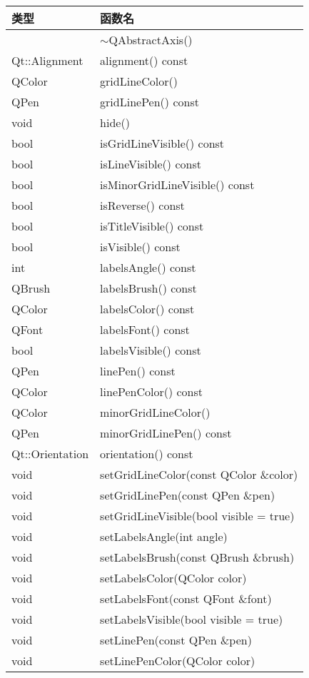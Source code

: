 \begin{longtable}{|l|l|}
\hline
类型  & 函数名\\
\hline
& $\sim$QAbstractAxis() \\
\hline
Qt::Alignment&	alignment() const \\
\hline
QColor&	gridLineColor()\\
\hline
QPen&	gridLinePen() const\\
\hline
void&	hide()\\
\hline
bool&	isGridLineVisible() const\\
\hline
bool&	isLineVisible() const\\
\hline
bool&	isMinorGridLineVisible() const\\
\hline
bool&	isReverse() const\\
\hline
bool&	isTitleVisible() const\\
\hline
bool&	isVisible() const\\
\hline
int&	labelsAngle() const\\
\hline
QBrush&	labelsBrush() const\\
\hline
QColor&	labelsColor() const\\
\hline
QFont&	labelsFont() const\\
\hline
bool&	labelsVisible() const\\
\hline
QPen&	linePen() const\\
\hline
QColor&	linePenColor() const\\
\hline
QColor&	minorGridLineColor()\\
\hline
QPen&	minorGridLinePen() const\\
\hline
Qt::Orientation &orientation() const\\
\hline
void&	setGridLineColor(const QColor \&color)\\
\hline
void&	setGridLinePen(const QPen \&pen)\\
\hline
void&	setGridLineVisible(bool visible = true)\\
\hline
void&	setLabelsAngle(int angle)\\
\hline
void&	setLabelsBrush(const QBrush \&brush)\\
\hline
void&	setLabelsColor(QColor color)\\
\hline
void&	setLabelsFont(const QFont \&font)\\
\hline
void	&setLabelsVisible(bool visible = true)\\
\hline
void	&setLinePen(const QPen \&pen)\\
\hline
void	&setLinePenColor(QColor color)\\

\end{longtable}
